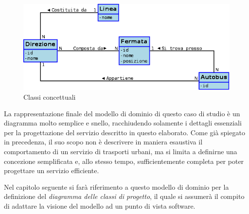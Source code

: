 \vspace{1cm}
\begin{figure}[htbp]
\begin{center}
\includegraphics[width=12cm]{contents/images/modelloDominio}
\end{center}
\caption{Classi concettuali}
\label{fig:domain_model}
\end{figure}
\vspace{1cm}

La rappresentazione finale del modello di dominio di questo caso di studio è un diagramma molto semplice e snello, racchiudendo solamente i dettagli essenziali per la progettazione del servizio descritto in questo elaborato.
Come già spiegato in precedenza, il suo scopo non è descrivere in maniera esaustiva il comportamento di un servizio di trasporti urbani, ma si limita a definirne una concezione semplificata e, allo stesso tempo, sufficientemente completa per poter progettare un servizio efficiente.

Nel capitolo seguente si farà riferimento a questo modello di dominio per la definizione del {\itshape diagramma delle classi di progetto}, il quale si assumerà il compito di adattare la visione del modello ad un punto di vista software.

\newpage